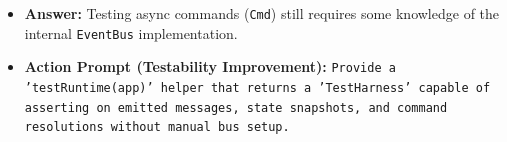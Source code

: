 \begin{itemize}
  \begin{itemize}
  \tightlist
  \item
    \textbf{Answer:} Testing async commands (\texttt{C\allowbreak{}m\allowbreak{}d}) still requires some knowledge of the internal \texttt{E\allowbreak{}v\allowbreak{}e\allowbreak{}n\allowbreak{}t\allowbreak{}B\allowbreak{}u\allowbreak{}s} implementation.
  \item
    \textbf{Action Prompt (Testability Improvement):} \texttt{P\allowbreak{}r\allowbreak{}o\allowbreak{}v\allowbreak{}i\allowbreak{}d\allowbreak{}e\allowbreak{} \allowbreak{}a\allowbreak{} \allowbreak{}'\allowbreak{}t\allowbreak{}e\allowbreak{}s\allowbreak{}t\allowbreak{}R\allowbreak{}u\allowbreak{}n\allowbreak{}t\allowbreak{}i\allowbreak{}m\allowbreak{}e\allowbreak{}(\allowbreak{}a\allowbreak{}p\allowbreak{}p\allowbreak{})\allowbreak{}'\allowbreak{} \allowbreak{}h\allowbreak{}e\allowbreak{}l\allowbreak{}p\allowbreak{}e\allowbreak{}r\allowbreak{} \allowbreak{}t\allowbreak{}h\allowbreak{}a\allowbreak{}t\allowbreak{} \allowbreak{}r\allowbreak{}e\allowbreak{}t\allowbreak{}u\allowbreak{}r\allowbreak{}n\allowbreak{}s\allowbreak{} \allowbreak{}a\allowbreak{} \allowbreak{}'\allowbreak{}T\allowbreak{}e\allowbreak{}s\allowbreak{}t\allowbreak{}H\allowbreak{}a\allowbreak{}r\allowbreak{}n\allowbreak{}e\allowbreak{}s\allowbreak{}s\allowbreak{}'\allowbreak{} \allowbreak{}c\allowbreak{}a\allowbreak{}p\allowbreak{}a\allowbreak{}b\allowbreak{}l\allowbreak{}e\allowbreak{} \allowbreak{}o\allowbreak{}f\allowbreak{} \allowbreak{}a\allowbreak{}s\allowbreak{}s\allowbreak{}e\allowbreak{}r\allowbreak{}t\allowbreak{}i\allowbreak{}n\allowbreak{}g\allowbreak{} \allowbreak{}o\allowbreak{}n\allowbreak{} \allowbreak{}e\allowbreak{}m\allowbreak{}i\allowbreak{}t\allowbreak{}t\allowbreak{}e\allowbreak{}d\allowbreak{} \allowbreak{}m\allowbreak{}e\allowbreak{}s\allowbreak{}s\allowbreak{}a\allowbreak{}g\allowbreak{}e\allowbreak{}s\allowbreak{},\allowbreak{} \allowbreak{}s\allowbreak{}t\allowbreak{}a\allowbreak{}t\allowbreak{}e\allowbreak{} \allowbreak{}s\allowbreak{}n\allowbreak{}a\allowbreak{}p\allowbreak{}s\allowbreak{}h\allowbreak{}o\allowbreak{}t\allowbreak{}s\allowbreak{},\allowbreak{} \allowbreak{}a\allowbreak{}n\allowbreak{}d\allowbreak{} \allowbreak{}c\allowbreak{}o\allowbreak{}m\allowbreak{}m\allowbreak{}a\allowbreak{}n\allowbreak{}d\allowbreak{} \allowbreak{}r\allowbreak{}e\allowbreak{}s\allowbreak{}o\allowbreak{}l\allowbreak{}u\allowbreak{}t\allowbreak{}i\allowbreak{}o\allowbreak{}n\allowbreak{}s\allowbreak{} \allowbreak{}w\allowbreak{}i\allowbreak{}t\allowbreak{}h\allowbreak{}o\allowbreak{}u\allowbreak{}t\allowbreak{} \allowbreak{}m\allowbreak{}a\allowbreak{}n\allowbreak{}u\allowbreak{}a\allowbreak{}l\allowbreak{} \allowbreak{}b\allowbreak{}u\allowbreak{}s\allowbreak{} \allowbreak{}s\allowbreak{}e\allowbreak{}t\allowbreak{}u\allowbreak{}p\allowbreak{}.}
  \end{itemize}
\end{itemize}

